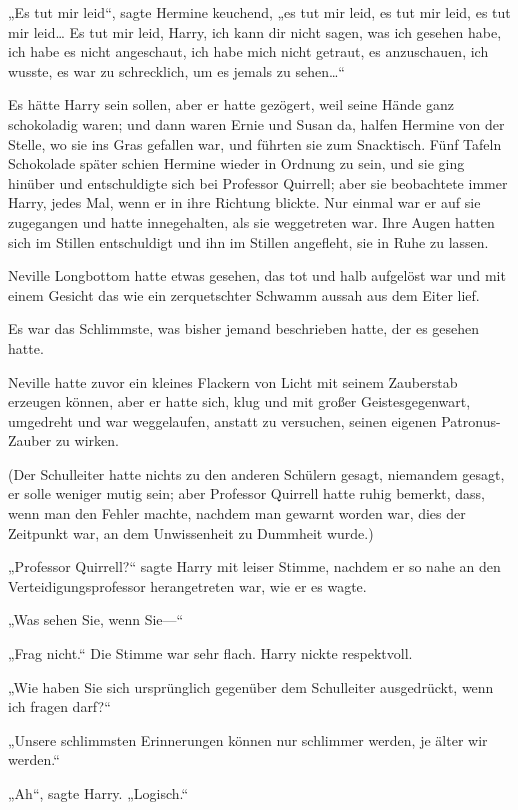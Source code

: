 {„Es tut mir leid“, sagte Hermine keuchend, „es tut mir leid, es tut mir leid, es tut mir leid… Es tut mir leid, Harry, ich kann dir nicht sagen, was ich gesehen habe, ich habe es nicht angeschaut, ich habe mich nicht getraut, es anzuschauen, ich wusste, es war zu schrecklich, um es jemals zu sehen…“

Es hätte Harry sein sollen, aber er hatte gezögert, weil seine Hände ganz schokoladig waren; und dann waren Ernie und Susan da, halfen Hermine von der Stelle, wo sie ins Gras gefallen war, und führten sie zum Snacktisch. Fünf Tafeln Schokolade später schien Hermine wieder in Ordnung zu sein, und sie ging hinüber und entschuldigte sich bei Professor Quirrell; aber sie beobachtete immer Harry, jedes Mal, wenn er in ihre Richtung blickte. Nur einmal war er auf sie zugegangen und hatte innegehalten, als sie weggetreten war. Ihre Augen hatten sich im Stillen entschuldigt und ihn im Stillen angefleht, sie in Ruhe zu lassen.

Neville Longbottom hatte etwas gesehen, das tot und halb aufgelöst war und mit einem Gesicht das wie ein zerquetschter Schwamm aussah aus dem Eiter lief.

Es war das Schlimmste, was bisher jemand beschrieben hatte, der es gesehen hatte.

Neville hatte zuvor ein kleines Flackern von Licht mit seinem Zauberstab erzeugen können, aber er hatte sich, klug und mit großer Geistesgegenwart, umgedreht und war weggelaufen, anstatt zu versuchen, seinen eigenen Patronus-Zauber zu wirken.

(Der Schulleiter hatte nichts zu den anderen Schülern gesagt, niemandem gesagt, er solle weniger mutig sein; aber Professor Quirrell hatte ruhig bemerkt, dass, wenn man den Fehler machte, nachdem man gewarnt worden war, dies der Zeitpunkt war, an dem Unwissenheit zu Dummheit wurde.)

„Professor Quirrell?“ sagte Harry mit leiser Stimme, nachdem er so nahe an den Verteidigungsprofessor herangetreten war, wie er es wagte.

„Was sehen Sie, wenn Sie—“

„Frag nicht.“ Die Stimme war sehr flach. Harry nickte respektvoll.

„Wie haben Sie sich ursprünglich gegenüber dem Schulleiter ausgedrückt, wenn ich fragen darf?“

„Unsere schlimmsten Erinnerungen können nur schlimmer werden, je älter wir werden.“

„Ah“, sagte Harry. „Logisch.“

}
